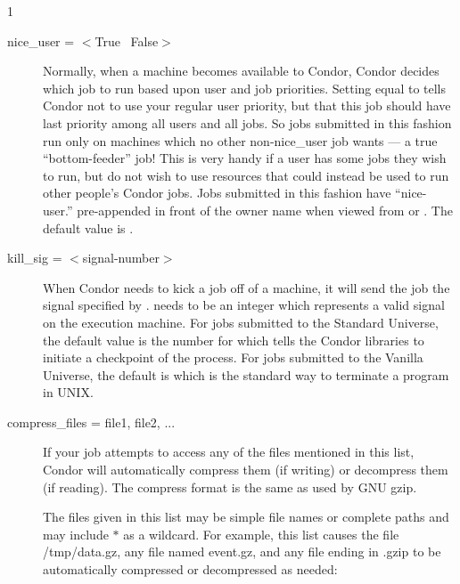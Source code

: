 \begin{ManPage}{\label{man-condor-submit}}{1}
\begin{description}

\item[nice\_user = $<$True \Bar\ False$>$] \label{man-condor-submit-nice}Normally, when a machine
becomes available to Condor, Condor decides which job to run based upon
user and job priorities. Setting  equal to 
tells Condor not to use your regular user priority, but that this job
should have last priority among all users and all jobs. So jobs
submitted in this fashion run only on machines which no other
non-nice\_user job wants --- a true ``bottom-feeder'' job! This is very
handy if a user has some jobs they wish to run, but do not wish to use
resources that could instead be used to run other people's Condor jobs. Jobs
submitted in this fashion have ``nice-user.'' pre-appended in front of
the owner name when viewed from  or .  The
default value is .



\item[kill\_sig = $<$signal-number$>$] When Condor needs to kick a job
off of a machine, it will send the job the signal specified by
.   needs to be an integer which
represents a valid signal on the execution machine.  For jobs submitted
to the Standard Universe, the default value is the number for
\verb@SIGTSTP@ which tells the Condor libraries to initiate a checkpoint
of the process.  For jobs submitted to the Vanilla Universe, the default 
is \verb@SIGTERM@ which is the standard way to terminate a program in UNIX.  


\item[compress\_files = file1, file2, ...]

If your job attempts to access any of the files mentioned in this list,
Condor will automatically compress them (if writing) or decompress them (if reading).
The compress format is the same as used by GNU gzip.

The files given in this list may be simple file names or complete paths and may
include $*$ as a wildcard.  For example, this list causes the file /tmp/data.gz,
any file named event.gz, and any file ending in .gzip to be automatically
compressed or decompressed as needed:


\end{description}
\end{ManPage}
